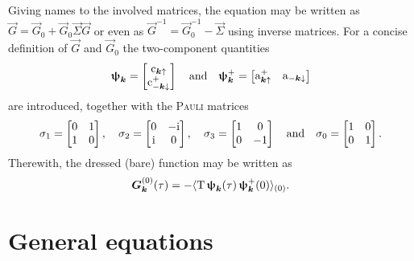 Giving names to the involved matrices, the  equation may be written
as $\vec G = \vec G_0 + \vec G_0 \vec \Sigma \vec G$ or even as $\vec G^{-1} =
\vec G_0^{-1} - \vec \Sigma$ using inverse matrices. For a concise definition of
$\vec G$ and $\vec G_0$ the two-component quantities
%
\begin{equation*}
	\boldsymbol \uppsi_{\boldsymbol k} =
    \begin{bmatrix}
        \mathrm c_{\boldsymbol k \uparrow} \\
        \mathrm c_{-\boldsymbol k \downarrow}^+
    \end{bmatrix}
    \quad \text{and} \quad
    \boldsymbol \uppsi_{\boldsymbol k}^+ =
    \begin{bmatrix}
        \mathrm a_{\boldsymbol k \uparrow}^+ &
        \mathrm a_{-\boldsymbol k \downarrow}
    \end{bmatrix}
\end{equation*}
%
are introduced, together with the \textsc{Pauli} matrices
%
\begin{equation*}
	\sigma_1 =
    \begin{bmatrix}
        0 & 1 \\
        1 & 0
    \end{bmatrix},
    \quad
    \sigma_2 =
    \begin{bmatrix}
        0 & -\mathrm i \\
        \mathrm i & 0
    \end{bmatrix},
    \quad
    \sigma_3 =
    \begin{bmatrix}
    1 & 0 \\
    0 & -1
    \end{bmatrix}
    \quad \text{and} \quad
    \sigma_0 =
    \begin{bmatrix}
        1 & 0 \\
        0 & 1
    \end{bmatrix}.
\end{equation*}
%
Therewith, the dressed (bare)  function may be written as
%
\begin{equation*}
    \boldsymbol G_{\boldsymbol k}^{(0)}(\tau) = -\langle\mathrm T \,
    \boldsymbol \uppsi_{\boldsymbol k}(\tau) \,
    \boldsymbol \uppsi_{\boldsymbol k}^+(0)\rangle_{(0)}.
\end{equation*}

\section{General equations}


